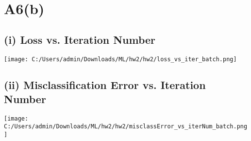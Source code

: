 \documentclass{article}
\begin{document}
\section*{A6(b)}

\subsection*{(i) Loss vs. Iteration Number}
\begin{center}
    \texttt{[image: C:/Users/admin/Downloads/ML/hw2/hw2/loss\_vs\_iter\_batch.png]}
\end{center}

\subsection*{(ii) Misclassification Error vs. Iteration Number}
\begin{center}
    \texttt{[image: C:/Users/admin/Downloads/ML/hw2/hw2/misclassError\_vs\_iterNum\_batch.png]}
\end{center}
\end{document}
